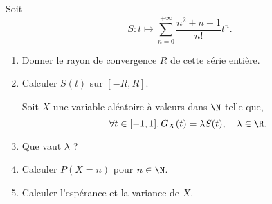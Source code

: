 \begin{enonce}
\begin{exercise}[ID={RMS135 E1498},subtitle={IMT MP 2024},tags={},difficulty={}]

Soit
\begin{equation*}
S : t \mapsto \sum_{n=0}^{+\infty} \frac{n^2 + n + 1}{n!} t^n.
\end{equation*}

\begin{enumerate}
  \item Donner le rayon de convergence $R$ de cette série entière.
  \item Calculer $S(t)$ sur $[-R, R]$.

  Soit $X$ une variable aléatoire à valeurs dans $\N$ telle que,
  \begin{equation*}
    \forall t \in [-1,1], G_X(t) = \lambda S(t),\quad \lambda \in \R.
  \end{equation*}
  \item Que vaut $\lambda$ ?
  \item Calculer $P(X = n)$ pour $n \in \N$.
  \item Calculer l’espérance et la variance de $X$.
\end{enumerate}

\end{exercise}
\begin{solution}
\end{solution}
\end{enonce}

